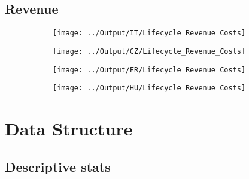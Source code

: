 \documentclass[12pt,notitlepage]{article}
\begin{document}
\subsection{Revenue} %
\label{sec:revenue}



\begin{figure}[!htpb]
\centering
\caption{Average Revenue and Costs by Year}
\begin{subfigure}{.49\textwidth}
    \centering
 \texttt{[image: ../Output/IT/Lifecycle\_Revenue\_Costs]}
\end{subfigure}%
\begin{subfigure}{.49\textwidth}
    \centering
 \texttt{[image: ../Output/CZ/Lifecycle\_Revenue\_Costs]}
\end{subfigure}
\begin{subfigure}{.49\textwidth}
    \centering
 \texttt{[image: ../Output/FR/Lifecycle\_Revenue\_Costs]}
\end{subfigure}%
\begin{subfigure}{.49\textwidth}
    \centering
 \texttt{[image: ../Output/HU/Lifecycle\_Revenue\_Costs]}
\end{subfigure}
\end{figure}
\pagebreak








\FloatBarrier
\section{Data Structure} %
\label{sec:data_structure}
\FloatBarrier


\subsection{Descriptive stats}
\begin{table}[!htpb]
    \centering
    \caption{Descriptive Statistics - Italy}
    \label{tab:my_label}
\end{table}
\end{document}
